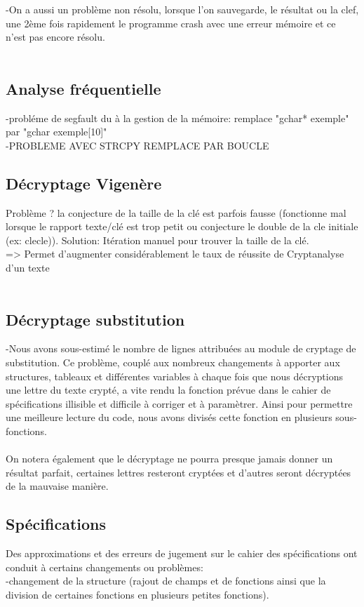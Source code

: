 \documentclass[a4]{article}
\begin{document}
	-On a aussi un problème non résolu, lorsque l'on sauvegarde, le résultat ou la clef, une 2ème fois rapidement le programme crash 
	avec une erreur mémoire et ce n'est pas encore résolu.\\
	\\
	
	\subsection{Analyse fréquentielle}
	-probléme de segfault du à la gestion de la mémoire: remplace "gchar* exemple" par "gchar exemple[10]"\\
	-PROBLEME AVEC STRCPY REMPLACE PAR BOUCLE
	\subsection{Décryptage Vigenère}
	Problème ? la conjecture de la taille de la clé est parfois fausse (fonctionne mal lorsque le rapport
		texte/clé est trop petit ou conjecture le double de la cle initiale (ex: clecle)).
		Solution: Itération manuel pour trouver la taille de la clé.\\
		=> Permet d'augmenter considérablement le taux de réussite de Cryptanalyse d'un texte \\ \\
	
	\subsection{Décryptage substitution}
	 -Nous avons sous-estimé le nombre de lignes attribuées au module de cryptage de substitution.
	  Ce problème, couplé aux nombreux changements à apporter aux structures, tableaux et différentes
	  variables à chaque fois que nous décryptions une lettre du texte crypté, a vite rendu la fonction
	  prévue dans le cahier de spécifications illisible et difficile à corriger et à paramètrer. Ainsi 
	  pour permettre une meilleure lecture du code, nous avons divisés cette fonction en plusieurs sous-fonctions. \\ \\
    
    On notera également que le décryptage ne pourra presque jamais donner un résultat parfait, certaines lettres resteront 
    cryptées et d'autres seront décryptées de la mauvaise manière. 
		
		\subsection{Spécifications}
		Des approximations et des erreurs de jugement sur le cahier des spécifications ont conduit à certains changements ou problèmes:\\
		-changement de la structure (rajout de champs et de fonctions ainsi que la division de certaines fonctions en plusieurs
		 petites fonctions).\\
		
\end{document}
